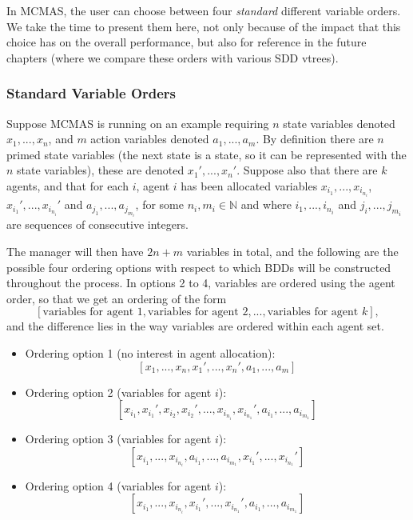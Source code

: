\documentclass[11pt]{article}
\begin{document}
In MCMAS, the user can choose between four \textit{standard} different variable orders. We take the time to present them here, not only because of the impact that this choice has on the overall performance, but also for reference in the future chapters (where we compare these orders with various SDD vtrees).

\subsubsection{Standard Variable Orders}
 \label{std_orderings}
Suppose MCMAS is running on an example requiring $n$ state variables denoted $x_1, ..., x_n$, and $m$ action variables denoted $a_1, ..., a_m$. By definition there are $n$ primed state variables (the next state is a state, so it can be represented with the $n$ state variables), these are denoted $x_1', ..., x_n'$. 
Suppose also that there are $k$ agents, and that for each $i$, agent $i$ has been allocated variables $x_{i_1}, ..., x_{i_{n_i}}$, $x_{i_1}', ..., x_{i_{n_i}}'$ and $a_{j_1}, ..., a_{j_{m_i}}$, for some $n_i, m_i \in \mathbb{N}$ and where $i_1, ..., i_{n_i}$ and $j_i, ..., j_{m_i}$ are sequences of consecutive integers.



The manager will then have $2n + m$ variables in total, and the following are the possible four ordering options with respect to which BDDs will be constructed throughout the process.
In options 2 to 4, variables are ordered using the agent order, so that we get an ordering of the form $$ [\mbox{variables for agent } 1, \mbox{variables for agent } 2, ...,  \mbox{variables for agent } k],$$ 
and the difference lies in the way variables are ordered within each agent set.
\begin{itemize}
\item Ordering option 1 (no interest in agent allocation):
$$[x_1, ..., x_n, x_1', ..., x_n', a_1, ..., a_m]$$
\item Ordering option 2 (variables for agent $i$):
$$
 [x_{i_1}, x_{i_1}', x_{i_2}, x_{i_2}',..., x_{i_{n_i}}, x_{i_{n_1}}', a_{i_1}, ..., a_{i_{m_1}}]
$$
\item Ordering option 3 (variables for agent $i$):
$$
 [x_{i_1}, ..., x_{i_{n_i}},a_{i_1}, ..., a_{i_{m_1}}, x_{i_1}', ..., x_{i_{n_1}}']
$$
\item Ordering option 4 (variables for agent $i$):
$$
 [x_{i_1}, ..., x_{i_{n_i}}, x_{i_1}', ..., x_{i_{n_1}}', a_{i_1}, ..., a_{i_{m_1}}]
$$
\end{itemize}
\end{document}
